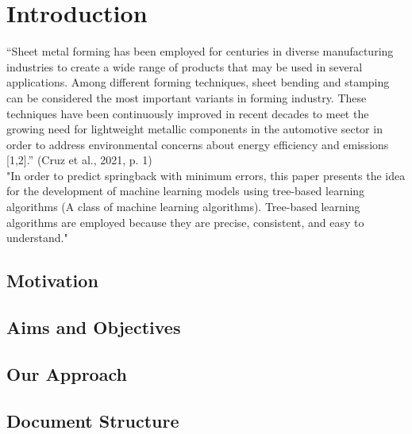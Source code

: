 \chapter{Introduction}

“Sheet metal forming has been employed for centuries in diverse manufacturing industries to create a wide range of products that may be used in several applications. Among different forming techniques, sheet bending and stamping can be considered the most important variants in forming industry. These techniques have been continuously improved in recent decades to meet the growing need for lightweight metallic components in the automotive sector in order to address environmental concerns about energy efficiency and emissions [1,2].” (Cruz et al., 2021, p. 1)  
\cite{cruz_applicationmachinelearning_2021} \\


"In order to predict springback with minimum errors, this paper presents the idea for the development of machine learning models using tree-based learning algorithms (A class of machine learning algorithms). Tree-based learning algorithms are employed because they are precise, consistent, and easy to understand." \cite{baig_machinelearningprediction_2021}

\section{Motivation} %

\section{Aims and Objectives} 

\section{Our Approach} 

\section{Document Structure}
